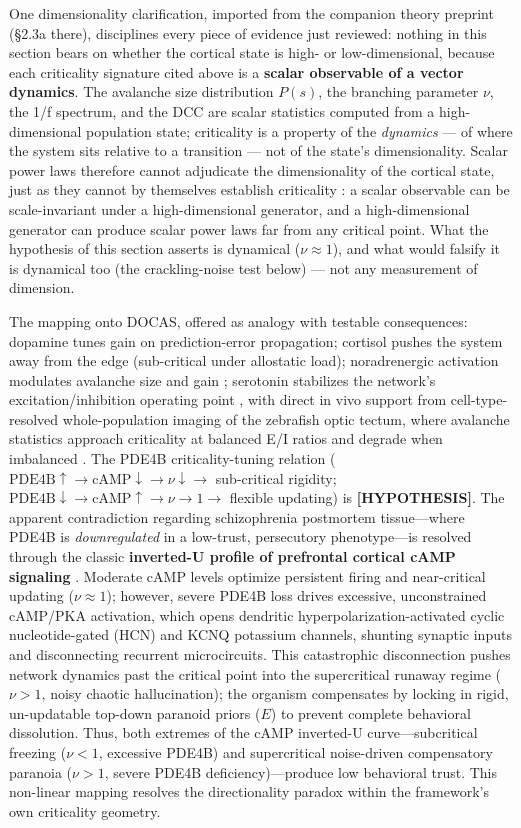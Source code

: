 \documentclass[11pt,twocolumn]{article}
\theoremstyle{plain}
\begin{document}
One dimensionality clarification, imported from the companion theory preprint (\S{}2.3a there), disciplines every piece of evidence just reviewed: nothing in this section bears on whether the cortical state is high- or low-dimensional, because each criticality signature cited above is a \textbf{scalar observable of a vector dynamics}. The avalanche size distribution $P(s)$, the branching parameter $\nu$, the 1/f spectrum, and the DCC are scalar statistics computed from a high-dimensional population state; criticality is a property of the \textit{dynamics} --- of where the system sits relative to a transition --- not of the state's dimensionality. Scalar power laws therefore cannot adjudicate the dimensionality of the cortical state, just as they cannot by themselves establish criticality \citep{bedard2006,touboul2017}: a scalar observable can be scale-invariant under a high-dimensional generator, and a high-dimensional generator can produce scalar power laws far from any critical point. What the hypothesis of this section asserts is dynamical ($\nu \approx 1$), and what would falsify it is dynamical too (the crackling-noise test below) --- not any measurement of dimension.

The mapping onto DOCAS, offered as analogy with testable consequences: dopamine tunes gain on prediction-error propagation; cortisol pushes the system away from the edge (sub-critical under allostatic load); noradrenergic activation modulates avalanche size and gain \citep{berridge2003}; serotonin stabilizes the network's excitation/inhibition operating point \citep{shew2011}, with direct in vivo support from cell-type-resolved whole-population imaging of the zebrafish optic tectum, where avalanche statistics approach criticality at balanced E/I ratios and degrade when imbalanced \citep{janbon2025}. The PDE4B criticality-tuning relation ($\mathrm{PDE4B}\uparrow \to \mathrm{cAMP}\downarrow \to \nu\downarrow \to$ sub-critical rigidity; $\mathrm{PDE4B}\downarrow \to \mathrm{cAMP}\uparrow \to \nu \to 1 \to$ flexible updating) is \textbf{[HYPOTHESIS]}. The apparent contradiction regarding schizophrenia postmortem tissue—where PDE4B is \textit{downregulated} in a low-trust, persecutory phenotype—is resolved through the classic \textbf{inverted-U profile of prefrontal cortical cAMP signaling} \citep{arnsten2009}. Moderate cAMP levels optimize persistent firing and near-critical updating ($\nu \approx 1$); however, severe PDE4B loss drives excessive, unconstrained cAMP/PKA activation, which opens dendritic hyperpolarization-activated cyclic nucleotide-gated (HCN) and KCNQ potassium channels, shunting synaptic inputs and disconnecting recurrent microcircuits. This catastrophic disconnection pushes network dynamics past the critical point into the supercritical runaway regime ($\nu > 1$, noisy chaotic hallucination); the organism compensates by locking in rigid, un-updatable top-down paranoid priors ($E$) to prevent complete behavioral dissolution. Thus, both extremes of the cAMP inverted-U curve—subcritical freezing ($\nu < 1$, excessive PDE4B) and supercritical noise-driven compensatory paranoia ($\nu > 1$, severe PDE4B deficiency)—produce low behavioral trust. This non-linear mapping resolves the directionality paradox within the framework's own criticality geometry.
\end{document}
